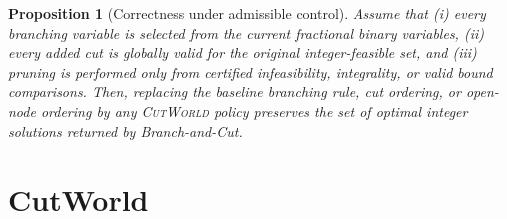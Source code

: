 \documentclass{article}
\newtheorem{proposition}{Proposition}
\newcommand{\CutWorld}{\textsc{CutWorld}}
\begin{document}
\begin{proposition}[Correctness under admissible control]
\label{prop:correctness}
Assume that (i) every branching variable is selected from the current fractional binary variables, (ii) every added cut is globally valid for the original integer-feasible set, and (iii) pruning is performed only from certified infeasibility, integrality, or valid bound comparisons. Then, replacing the baseline branching rule, cut ordering, or open-node ordering by any \CutWorld{} policy preserves the set of optimal integer solutions returned by Branch-and-Cut.
\end{proposition}




\section{CutWorld}
\label{sec:method}
\end{document}
